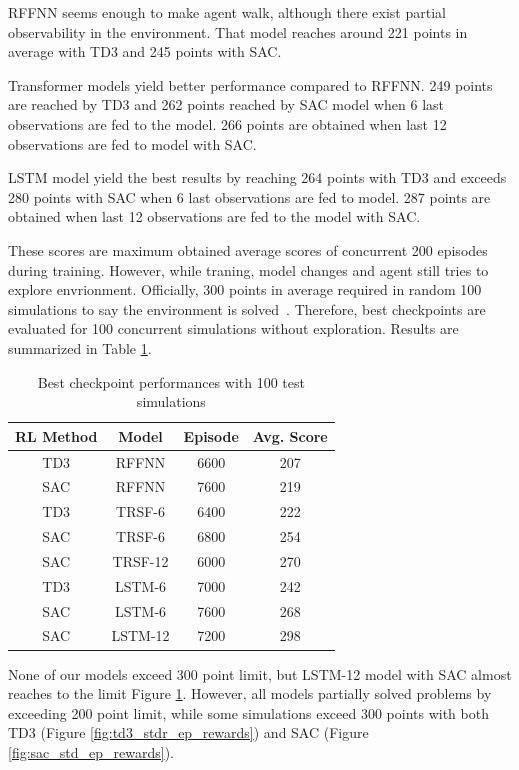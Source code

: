 \documentclass[a4paper, 12pt]{article} %
\begin{document}
RFFNN seems enough to make agent walk, although there exist partial observability in the environment. 
That model reaches around 221 points in average with TD3 and 245 points with SAC. 

Transformer models yield better performance compared to RFFNN. 249 points are reached by TD3 and 262 points reached by SAC model when 6 last observations are fed to the model. 266 points are obtained when last 12 observations are fed to model with SAC.

LSTM model yield the best results by reaching 264 points with TD3 and exceeds 280 points with SAC when 6 last observations are fed to model. 287 points are obtained when last 12 observations are fed to the model with SAC. 

These scores are maximum obtained average scores of concurrent 200 episodes during training. 
However, while traning, model changes and agent still tries to explore envrionment. 
Officially, 300 points in average required in random 100 simulations to say the environment is solved~\cite{noauthor_gymleaderboard_2021}.
Therefore, best checkpoints are evaluated for 100 concurrent simulations without exploration. 
Results are summarized in Table \ref{table:ckpt_performance}.

\begin{table}
	\begin{center}
		\caption{Best checkpoint performances with 100 test simulations}
		\begin{tabular}{||c c c c||} 
			\hline
			RL Method & Model & Episode & Avg. Score \\ [0.5ex] 
			\hline\hline
			TD3 & RFFNN & 6600 & 207 \\ 
			\hline
			SAC & RFFNN & 7600 & 219 \\
			\hline
			TD3 & TRSF-6 & 6400 & 222 \\
			\hline
			SAC & TRSF-6 & 6800 & 254 \\
			\hline
			SAC & TRSF-12 & 6000 & 270 \\
			\hline
			TD3 & LSTM-6 & 7000 & 242 \\
			\hline
			SAC & LSTM-6 & 7600 & 268 \\
			\hline
			SAC & LSTM-12 & 7200 & 298 \\ [1ex] 
			\hline
		\end{tabular}
		\label{table:ckpt_performance}
	\end{center}
\end{table}

None of our models exceed 300 point limit, but LSTM-12 model with SAC almost reaches to the limit Figure \ref{table:ckpt_performance}. 
However, all models partially solved problems by exceeding 200 point limit, while some simulations exceed 300 points with both TD3 (Figure \ref{fig:td3_stdr_ep_rewards}) and SAC (Figure \ref{fig:sac_std_ep_rewards}). 
\end{document}
